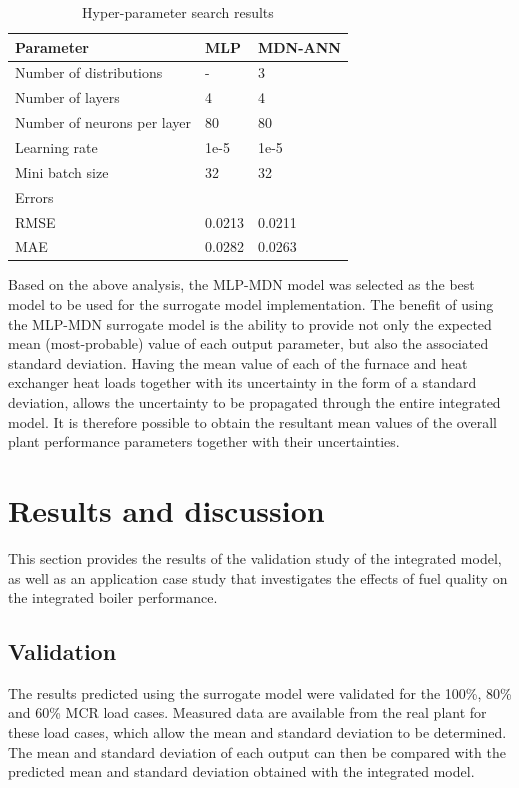 \documentclass[a4paper,fleqn]{cas-dc}
\begin{document}
\begin{table}[h!]
\caption{Hyper-parameter search results}\label{tbl_hyper_results}
\begin{tabular*}{\tblwidth}{lp{}l}
\toprule
 Parameter& MLP & MDN-ANN \\ %
\midrule
 Number of distributions & - & 3  \\
 Number of layers & 4 & 4\\
 Number of neurons per layer & 80  & 80\\
 Learning rate & 1e-5 &  1e-5   \\
 Mini batch size  &32 & 32  \\
\midrule
Errors & &\\
\midrule
RMSE & 0.0213 & 0.0211\\
MAE & 0.0282& 0.0263\\
\bottomrule
\end{tabular*}
\end{table}  

Based on the above analysis, the MLP-MDN model was selected as the best model to be used for the surrogate model implementation. The benefit of using the MLP-MDN surrogate model is the ability to provide not only the expected mean (most-probable) value of each output parameter, but also the associated standard deviation. Having the mean value of each of the furnace and heat exchanger heat loads together with its uncertainty in the form of a standard deviation, allows the uncertainty to be propagated through the entire integrated model. It is therefore possible to obtain the resultant mean values of the overall plant performance parameters together with their uncertainties.

\section{Results and discussion}\label{sec_results_diss}
This section provides the results of the validation study of the integrated model, as well as an application case study that investigates the effects of fuel quality on the integrated boiler performance. 

\subsection{Validation}\label{sec_result_1}
The results predicted using the surrogate model were validated for the 100\%, 80\% and 60\% MCR load cases. Measured data are available from the real plant for these load cases, which allow the mean and standard deviation to be determined.  The mean and standard deviation of each output can then be compared with the predicted mean and standard deviation obtained with the integrated model.\\
\end{document}
